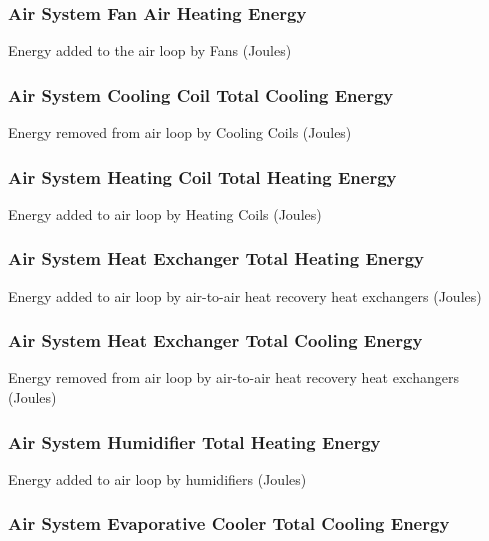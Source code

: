 \subsubsection{Air System Fan Air Heating Energy}\label{air-system-fan-air-heating-energy}

Energy added to the air loop by Fans (Joules)

\subsubsection{Air System Cooling Coil Total Cooling Energy}\label{air-system-cooling-coil-total-cooling-energy}

Energy removed from air loop by Cooling Coils (Joules)

\subsubsection{Air System Heating Coil Total Heating Energy}\label{air-system-heating-coil-total-heating-energy}

Energy added to air loop by Heating Coils (Joules)

\subsubsection{Air System Heat Exchanger Total Heating Energy}\label{air-system-heat-exchanger-total-heating-energy}

Energy added to air loop by air-to-air heat recovery heat exchangers (Joules)

\subsubsection{Air System Heat Exchanger Total Cooling Energy}\label{air-system-heat-exchanger-total-cooling-energy}

Energy removed from air loop by air-to-air heat recovery heat exchangers (Joules)

\subsubsection{Air System Humidifier Total Heating Energy}\label{air-system-humidifier-total-heating-energy}

Energy added to air loop by humidifiers (Joules)

\subsubsection{Air System Evaporative Cooler Total Cooling Energy}\label{air-system-evaporative-cooler-total-cooling-energy}

